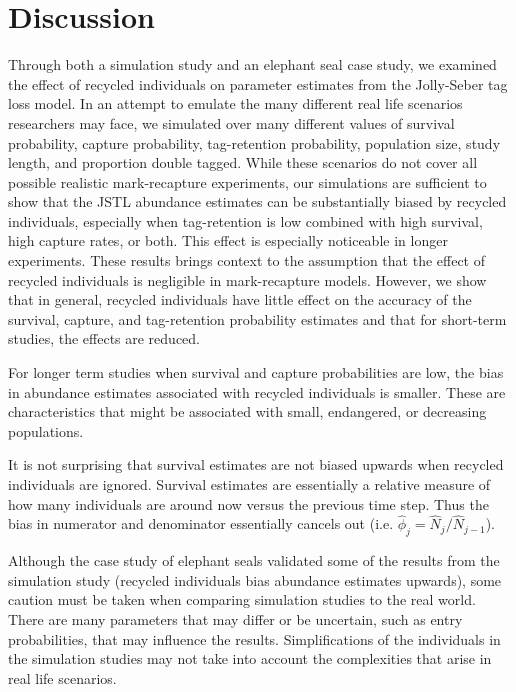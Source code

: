 \documentclass[12pt]{article}
\begin{document}
\section{Discussion}\label{discussion}
Through both a simulation study and an elephant seal case study, we examined the effect of recycled individuals on parameter estimates from the Jolly-Seber tag loss model.
In an attempt to emulate the many different real life scenarios
researchers may face, we simulated over many different values of
survival probability, capture probability, tag-retention probability, population size, study length, and proportion double tagged. While
these scenarios do not cover all possible realistic mark-recapture
experiments, our simulations are sufficient to show that the JSTL
abundance estimates can be substantially biased by recycled individuals,
especially when tag-retention is low combined with high survival, high
capture rates, or both. This effect is especially noticeable in longer
experiments. These results brings context to the assumption that the effect of
recycled individuals is negligible in mark-recapture models. However, we
show that in general, recycled individuals have little effect on the
accuracy of the survival, capture, and tag-retention probability
estimates and that for short-term studies, the effects are reduced.

For longer term studies when survival and capture probabilities are low, the bias in abundance estimates associated with recycled individuals is smaller.  These are characteristics that might be associated with small, endangered, or decreasing populations. 

It is not surprising that survival estimates are not biased upwards when recycled individuals are ignored.  Survival estimates are essentially a relative measure of how many individuals are around now versus the previous time step.  Thus the bias in numerator and denominator essentially cancels out (i.e. $\hat{\phi}_j=\hat{N}_{j}/\hat{N}_{j-1}$).	

Although the case study of elephant seals validated some of the results from
the simulation study (recycled individuals bias abundance estimates
upwards), some caution must be taken when comparing simulation studies
to the real world. There are many parameters that may differ or be
uncertain, such as entry probabilities, that may influence the results.
Simplifications of the individuals in the simulation studies may not
take into account the complexities that arise in real life
scenarios.
\end{document}
